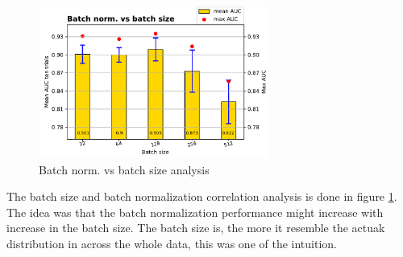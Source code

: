 \begin{figure}[ht]
\centering
\includegraphics[height= 5cm]{images/contrastive/contrastive_loss_bnvsbs_bar}
\caption{Batch norm. vs batch size analysis}
\label{fig:contrastive_loss_bnvsbs_bar}
\end{figure}

The batch size and batch normalization correlation analysis is done in figure \ref{fig:contrastive_loss_bnvsbs_bar}. The idea was that the batch normalization performance might increase with increase in the batch size. The 
batch size is, the more it resemble the actuak distribution in across the whole data, this was one of the intuition. 

